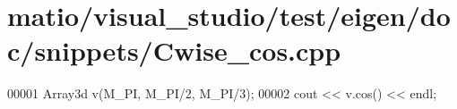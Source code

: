 \hypertarget{matio_2visual__studio_2test_2eigen_2doc_2snippets_2_cwise__cos_8cpp_source}{}\section{matio/visual\+\_\+studio/test/eigen/doc/snippets/\+Cwise\+\_\+cos.cpp}
\label{matio_2visual__studio_2test_2eigen_2doc_2snippets_2_cwise__cos_8cpp_source}

\begin{DoxyCode}
00001 Array3d v(M\_PI, M\_PI/2, M\_PI/3);
00002 cout << v.cos() << endl;
\end{DoxyCode}
